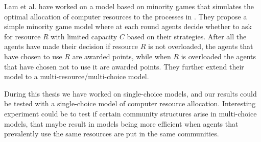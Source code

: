 Lam et al. have worked on a model based on minority games that simulates the optimal allocation of computer resources to the processes in \cite{lam2007adaptive}.
They propose a simple minority game model where at each round agents decide whether to ask for resource $R$ with limited capacity $C$ based on their strategies.
After all the agents have made their decision if resource $R$ is not overloaded, the agents that have chosen to use $R$ are awarded points, while when $R$ is overloaded the agents that have chosen not to use it are awarded points.
They further extend their model to a multi-resource/multi-choice model.

During this thesis we have worked on single-choice models, and our results could be tested with a single-choice model of computer resource allocation.
Interesting experiment could be to test if certain community structures arise in multi-choice models, that maybe result in models being more efficient when agents that prevalently use the same resources are put in the same communities.
